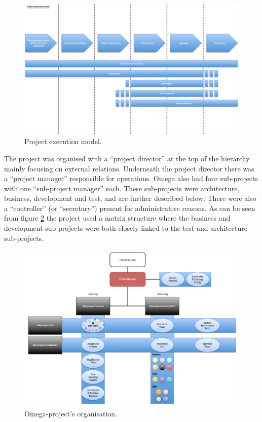 \begin{figure}
\centering
\includegraphics[trim = 0mm 0mm 0mm 0mm,width=155mm]{images/execution_model.png}
\caption{Project execution model.}
\label{project_execution}
\end{figure}

The project was organised with a ``project director'' at the top of the hierarchy mainly focusing on external relations. Underneath the project director there was a ``project manager'' responsible for operations. Omega also had four sub-projects with one ``sub-project manager'' each. These sub-projects were architecture, business, development and test, and are further described below. There were also a ``controller'' (or ``secretary'') present for administrative reasons. As can be seen from figure \ref{omega} the project used a matrix structure where the business and development sub-projects were both closely linked to the test and architecture sub-projects.

\begin{figure}
\centering
\includegraphics[trim = 0mm 0mm 0mm 0mm,width=155mm]{images/omega_organisation.png}
\caption{Omega-project's organisation.}
\label{omega}
\end{figure}

